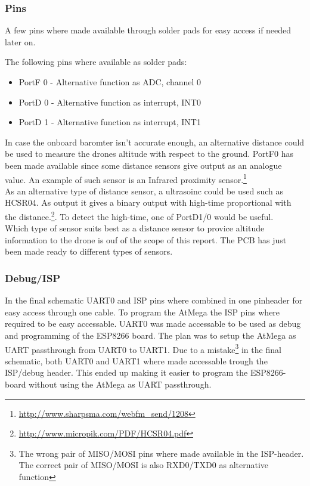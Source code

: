 \subsubsection{Pins}
A few pins where made available through solder pads for easy access if needed later on.

The following pins where available as solder pads:
\begin{itemize}
	\item PortF 0 - Alternative function as ADC, channel 0
	\item PortD 0 - Alternative function as interrupt, INT0
	\item PortD 1 - Alternative function as interrupt, INT1
\end{itemize}
In case the onboard baromter isn't accurate enough, an alternative distance could be used to measure the drones altitude with respect to the ground.
PortF0 has been made available since some distance sensors give output as an analogue value. 
An example of such sensor is an Infrared proximity sensor.\footnote{\url{http://www.sharpsma.com/webfm\_send/1208}} \\
As an alternative type of distance sensor, a ultrasoinc could be used such as HCSR04.
As output it gives a binary output with high-time proportional with the distance.\footnote{\url{http://www.micropik.com/PDF/HCSR04.pdf}}.
To detect the high-time, one of PortD1/0 would be useful. \\

Which type of sensor suits best as a distance sensor to provice altitude information to the drone is ouf of the scope of this report. The PCB has just been made ready to different types of sensors.

\subsubsection{Debug/ISP}
In the final schematic UART0 and ISP pins where combined in one pinheader for easy access through one cable. 
To program the AtMega the ISP pins where required to be easy accessable. 
UART0 was made accessable to be used as debug and programming of the ESP8266 board.
The plan was to setup the AtMega as UART passthrough from UART0 to UART1.
Due to a mistake\footnote{The wrong pair of MISO/MOSI pins where made available in the ISP-header. The correct pair of MISO/MOSI is also RXD0/TXD0 as alternative function} in the final schematic, both UART0 and UART1 where made accessable trough the ISP/debug header. 
This ended up making it easier to program the ESP8266-board without using the AtMega as UART passthrough.

